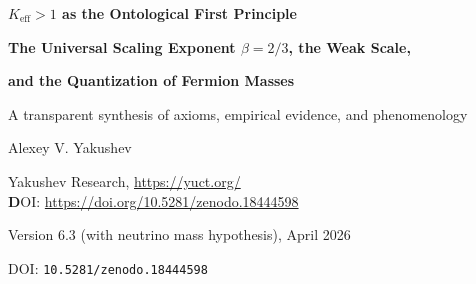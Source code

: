 \documentclass[12pt,a4paper]{article}
\begin{document}
	
	\begin{titlepage}
		\centering
		\vspace*{1cm}
		
		{\Huge\bfseries \(K_{\mathrm{eff}} > 1\) as the Ontological First Principle\par}
		\vspace{0.3cm}
		{\Large\bfseries The Universal Scaling Exponent \(\beta = 2/3\), the Weak Scale,\par}
		\vspace{0.1cm}
		{\Large\bfseries and the Quantization of Fermion Masses\par}
		\vspace{0.5cm}
		{\large A transparent synthesis of axioms, empirical evidence, and phenomenology\par}
		
		\vspace{1cm}
		
		{\large Alexey V. Yakushev\par}
		\vspace{0.3cm}
		\normalsize Yakushev Research, \url{https://yuct.org/} \\
		
		\vspace{0.5cm}
		{\sffamily\footnotesize \textbf DOI: \url{https://doi.org/10.5281/zenodo.18444598}}%
		
		\vspace{1.0cm}
		
		{\normalsize Version 6.3 (with neutrino mass hypothesis), April 2026\par}
		\vspace{0.3cm}
		{\normalsize DOI: \texttt{10.5281/zenodo.18444598}\par}
		
		\vfill
		

\end{titlepage}
\end{document}
